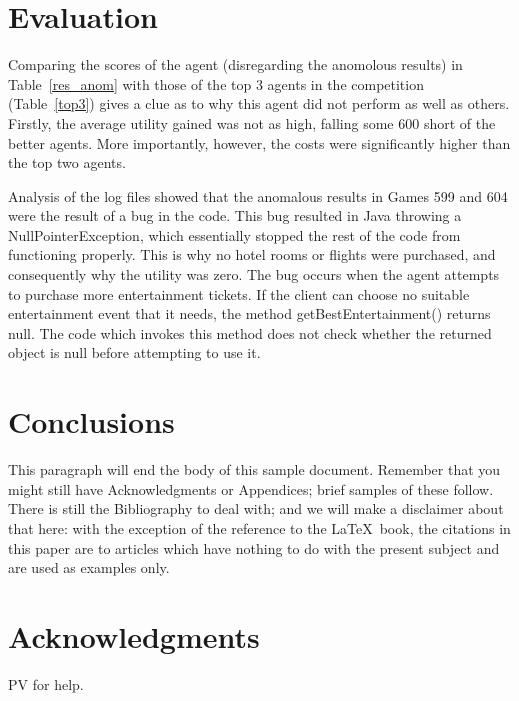 \documentclass{acm_proc_article-sp}
\begin{document}
\section{Evaluation}
 Comparing the scores of the agent (disregarding the anomolous results) in Table~\ref{res_anom} with those of the top 3 agents in the competition (Table~\ref{top3}) gives a clue as to why this agent did not perform as well as others.  Firstly, the average utility gained was not as high, falling some 600 short of the better agents.  More importantly, however, the costs were significantly higher than the top two agents.

 Analysis of the log files showed that the anomalous results in Games 599 and 604 were the result of a bug in the code.  This bug resulted in Java throwing a NullPointerException, which essentially stopped the rest of the code from functioning properly.  This is why no hotel rooms or flights were purchased, and consequently why the utility was zero.  The bug occurs when the agent attempts to purchase more entertainment tickets.  If the client can choose no suitable entertainment event that it needs, the method getBestEntertainment() returns null.  The code which invokes this method does not check whether the returned object is null before attempting to use it.

\section{Conclusions}
This paragraph will end the body of this sample document.
Remember that you might still have Acknowledgments or
Appendices; brief samples of these
follow.  There is still the Bibliography to deal with; and
we will make a disclaimer about that here: with the exception
of the reference to the \LaTeX\ book, the citations in
this paper are to articles which have nothing to
do with the present subject and are used as
examples only.

\section{Acknowledgments}
PV for help.

%

%
%
\balancecolumns
\end{document}
